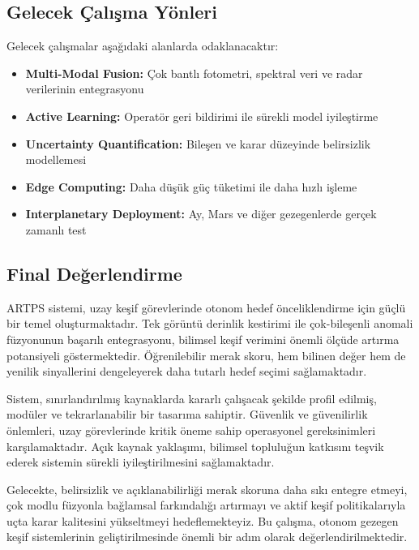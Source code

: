\documentclass[12pt]{article}
\begin{document}
\subsection{Gelecek Çalışma Yönleri}
Gelecek çalışmalar aşağıdaki alanlarda odaklanacaktır:

\begin{itemize}
\item \textbf{Multi-Modal Fusion:} Çok bantlı fotometri, spektral veri ve radar verilerinin entegrasyonu
\item \textbf{Active Learning:} Operatör geri bildirimi ile sürekli model iyileştirme
\item \textbf{Uncertainty Quantification:} Bileşen ve karar düzeyinde belirsizlik modellemesi
\item \textbf{Edge Computing:} Daha düşük güç tüketimi ile daha hızlı işleme
\item \textbf{Interplanetary Deployment:} Ay, Mars ve diğer gezegenlerde gerçek zamanlı test
\end{itemize}

\subsection{Final Değerlendirme}
ARTPS sistemi, uzay keşif görevlerinde otonom hedef önceliklendirme için güçlü bir temel oluşturmaktadır. Tek görüntü derinlik kestirimi ile çok-bileşenli anomali füzyonunun başarılı entegrasyonu, bilimsel keşif verimini önemli ölçüde artırma potansiyeli göstermektedir. Öğrenilebilir merak skoru, hem bilinen değer hem de yenilik sinyallerini dengeleyerek daha tutarlı hedef seçimi sağlamaktadır.

Sistem, sınırlandırılmış kaynaklarda kararlı çalışacak şekilde profil edilmiş, modüler ve tekrarlanabilir bir tasarıma sahiptir. Güvenlik ve güvenilirlik önlemleri, uzay görevlerinde kritik öneme sahip operasyonel gereksinimleri karşılamaktadır. Açık kaynak yaklaşımı, bilimsel topluluğun katkısını teşvik ederek sistemin sürekli iyileştirilmesini sağlamaktadır.

Gelecekte, belirsizlik ve açıklanabilirliği merak skoruna daha sıkı entegre etmeyi, çok modlu füzyonla bağlamsal farkındalığı artırmayı ve aktif keşif politikalarıyla uçta karar kalitesini yükseltmeyi hedeflemekteyiz. Bu çalışma, otonom gezegen keşif sistemlerinin geliştirilmesinde önemli bir adım olarak değerlendirilmektedir.

\clearpage
\end{document}
